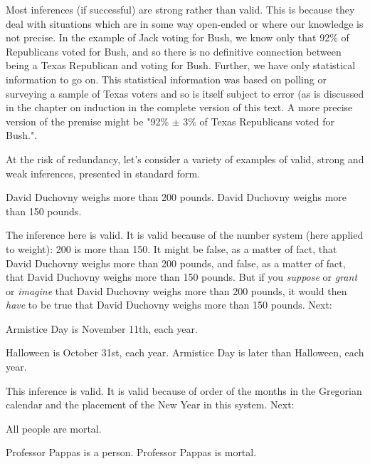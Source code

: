 Most inferences (if successful) are strong rather than valid. This is because they deal with situations which are in some way open-ended or where our knowledge is not precise. In the example of Jack voting for Bush, we know only that 92\% of Republicans voted for Bush, and so there is no definitive connection between being a Texas Republican and voting for Bush. Further, we have only statistical information to go on. This statistical information was based on polling or surveying a sample of Texas voters and so is itself subject to error (as is discussed in the chapter on induction in the complete version of this text.\label{ver_var}  A more precise version of the premise might be "92\% $\pm$ 3\% of Texas Republicans voted for Bush.".

At the risk of redundancy, let's consider a variety of examples of valid, strong and weak inferences, presented in standard form. 

\begin{earg*}
\item  David Duchovny weighs more than 200 pounds. 
\itemc  David Duchovny weighs more than 150 pounds.
\end{earg*}

The inference here is valid. It is valid because of the number system (here applied to weight): 200 is more than 150. It might be false, as a matter of fact, that David Duchovny weighs more than 200 pounds, and false, as a matter of fact, that David Duchovny weighs more than 150 pounds. But if you \textit{suppose }or \textit{grant }or \textit{imagine }that David Duchovny weighs more than 200 pounds, it would then \textit{have }to be true that David Duchovny weighs more than 150 pounds. Next:

\begin{earg*}
\item  Armistice Day is November 11th, each year. 
\item  Halloween is October 31st, each year.
\itemc  Armistice Day is later than Halloween, each year. 
\end{earg*}

This inference is valid. It is valid because of order of the months in the Gregorian calendar and the placement of the New Year in this system. Next:

\begin{earg*}
\item  All people are mortal. 
\item  Professor Pappas is a person. 
\itemc  Professor Pappas is mortal. 
\end{earg*}

